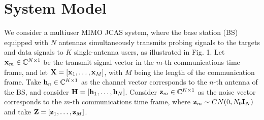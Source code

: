 \documentclass[conference]{IEEEtran}
\begin{document}
\section{System Model}
\label{section:2}
We consider a multiuser MIMO JCAS system, where the base station (BS) equipped with $N$ antennas simultaneously transmits probing signals to the targets and data signals to $K$ %
single-antenna users, as illustrated in Fig. 1. %
Let ${\mathbf{x}}_m \in \mathbb{C}^{N \times 1}$ be the transmit signal vector in the $m$-th communications time frame, and let ${\mathbf{X}} = [{\mathbf{x}}_1, \ldots, {\mathbf{x}}_M]$, with $M$ being the length of the communication frame. Take ${\mathbf{h}}_n \in \mathbb{C}^{K \times 1}$ as the channel vector corresponds to the $n$-th antenna of the BS, and consider ${\mathbf{H}} = [{\mathbf{h}}_1, \ldots, {\mathbf{h}}_N]$. Consider ${\mathbf{z}}_m \in \mathbb{C}^{K \times 1}$ as the noise vector corresponds to the $m$-th communications time frame, where ${\mathbf{z}}_m \sim CN(0, N_0\textbf{I}_N )$ and take ${\mathbf{Z}} = [{\mathbf{z}}_1, \ldots, {\mathbf{z}}_M]$.

\end{document}
